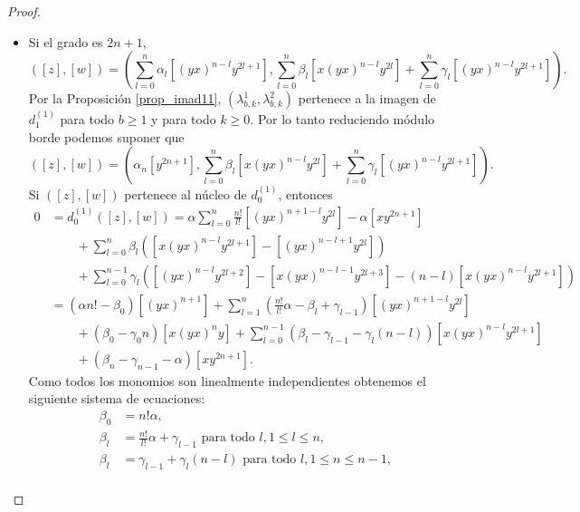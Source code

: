 \documentclass[fleqn,../tesis.tex]{subfiles}
\begin{document}
\begin{proof}
\begin{itemize}
    \item Si el grado es $2n + 1$,
    \[
        ([z], [w]) = \left(\sum_{l = 0}^{n}\alpha_l \left[(yx)^{n - l}y^{2l + 1}\right],
            \sum_{l = 0}^{n}\beta_l \left[x(yx)^{n - l}y^{2l}\right]
                + \sum_{l = 0}^{n}\gamma_l\left[(yx)^{n - l}y^{2l + 1}\right]\right).    
    \]
    Por la Proposición \ref{prop_imad11}, $\left(\lambda_{b, k}^{1}, \lambda_{b, k}^{2}\right)$ pertenece
    a la imagen de $d_1^{(1)}$  para todo $b\geq 1$ y para todo $k \geq 0$. Por lo tanto
    reduciendo módulo borde podemos suponer que 
    \[
        ([z], [w]) = \left(\alpha_n \left[y^{2n + 1}\right],
            \sum_{l = 0}^{n}\beta_l \left[x(yx)^{n - l}y^{2l}\right]
                + \sum_{l = 0}^{n}\gamma_l\left[(yx)^{n - l}y^{2l + 1}\right]\right). 
    \]
    Si $ ([z], [w])$ pertenece al núcleo de $d_{0}^{(1)}$, entonces
    \begin{align*}
        0 &= d_{0}^{(1)}([z], [w]) = \alpha \sum_{l = 0}^{n}\frac{n!}{l!}\left[(yx)^{n +1 - l}y^{2l}\right] - \alpha \left[xy^{2n + 1}\right]\\
        &\qquad +\sum_{l = 0}^{n}\beta_l \left( \left[x(yx)^{n - l}y^{2l + 1}\right] - \left[(yx)^{n - l + 1}y^{2l} \right] \right)\\
        &\qquad + \sum_{l = 0}^{n - 1}\gamma_l \left( \left[(yx)^{n - l}y^{2l + 2}\right]
            - \left[x(yx)^{n - l - 1}y^{2l + 3}\right] - (n - l)\left[x(yx)^{n - l}y^{2l+ 1}\right]\right)\\
        &= \left(\alpha n! - \beta_0\right)\left[(yx)^{n + 1}\right]
            + \sum_{l = 1}^{n}\left(\frac{n!}{l!}\alpha - \beta_l + \gamma_{l - 1}\right)\left[(yx)^{n + 1 - l}y^{2l}\right]\\
        &\qquad + \left(\beta_0 - \gamma_0 n\right)\left[x(yx)^{n}y\right]
            + \sum_{l = 0}^{n - 1}\left(\beta_l - \gamma_{l - 1} - \gamma_l(n - l)\right)\left[x(yx)^{n - l}y^{2l + 1}\right]\\
        &\qquad + \left(\beta_n - \gamma_{n - 1} - \alpha\right)\left[xy^{2n + 1}\right].
    \end{align*}
    Como todos los monomios son linealmente independientes obtenemos el siguiente sistema de ecuaciones:
    \begin{align*}
        \beta_0 &= n! \alpha,\\
        \beta_l &= \frac{n!}{l!}\alpha + \gamma_{l - 1} \text{ para todo }l, 1 \leq l \leq n,\\
        \beta_l &= \gamma_{l - 1} + \gamma_l(n - l) \text{ para todo } l, 1\leq n \leq n - 1,\\

\end{align*}
\end{itemize}
\end{proof}
\end{document}
